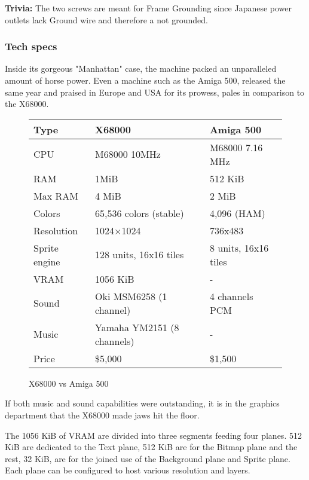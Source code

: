 \textbf{Trivia:} The two  screws are meant for Frame Grounding since Japanese power outlets lack Ground wire and therefore a not grounded.


\pagebreak



\subsubsection{Tech specs}  
Inside its gorgeous "Manhattan" case, the machine packed an unparalleled amount of horse power. Even a machine such as the Amiga 500, released the same year and praised in Europe and USA for its prowess, pales in comparison to the X68000. 


 \begin{figure}[H]
\begin{tabularx}{\textwidth}{lXX}
  \toprule    
  \textbf{Type } & \textbf{ X68000 } & \textbf{ Amiga 500 }\\  
  \toprule   
    
CPU & M68000 10MHz & M68000 7.16 MHz\\  
RAM & 1MiB & 512 KiB\\
Max RAM & 4 MiB & 2 MiB\\ 
Colors  & 65,536 colors (stable) & 4,096 (HAM) \\
Resolution & 1024×1024 & 736x483 \\
Sprite engine & 128 units, 16x16 tiles & 8 units, 16x16 tiles\\
VRAM & 1056 KiB & -\\
Sound & Oki MSM6258 (1 channel)  & 4 channels PCM\\ 
Music & Yamaha YM2151 (8 channels)  & -\\ 
Price & \$5,000 & \$1,500 \\
  \toprule   
\end{tabularx}
\caption*{X68000 vs Amiga 500}
\end{figure}


If both music and sound capabilities were outstanding, it is in the graphics department that the X68000 made jaws hit the floor.

The 1056 KiB of VRAM are divided into three segments feeding four planes. 512 KiB are dedicated to the Text plane, 512 KiB are for the Bitmap plane and the rest, 32 KiB, are for the joined use of the Background plane and Sprite plane. Each plane can be configured to host various resolution and layers.

